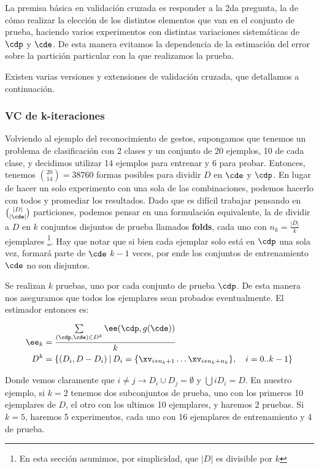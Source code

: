 La premisa básica en validación cruzada es responder a la 2da pregunta, la de cómo realizar la elección de los distintos elementos que van en el conjunto de prueba, haciendo varios experimentos con distintas variaciones sistemáticas de $\cdp$ y $\cde$. De esta manera evitamos la dependencia de la estimación del error sobre la partición particular con la que realizamos la prueba.

Existen varias versiones y extensiones de validación cruzada, que detallamos a continuación.

\subsubsection{VC de k-iteraciones}

Volviendo al ejemplo del reconocimiento de gestos, supongamos que tenemos un problema de clasificación con 2 clases y un conjunto de 20 ejemplos, 10 de cada clase, y decidimos utilizar 14 ejemplos para entrenar y 6 para probar. Entonces, tenemos $\binom{20}{14}=38760$ formas posibles para dividir $D$ en $\cde$ y $\cdp$. En lugar de hacer un solo experimento con una sola de las combinaciones, podemos hacerlo con todos y promediar los resultados. Dado que es difícil trabajar pensando en $\binom{|D|}{|\cde|}$ particiones, podemos pensar en una formulación equivalente, la de dividir a $D$ en $k$ conjuntos disjuntos de prueba llamados \textbf{folds}, cada uno con $n_k=\frac{|D|}{k}$ ejemplares \footnote{En esta sección asumimos, por simplicidad, que $|D|$ es divisible por $k$}. Hay que notar que si bien cada ejemplar solo está en $\cdp$ una sola vez, formará parte de $\cde$ $k-1$ veces, por ende los conjuntos de entrenamiento $\cde$ no son disjuntos. 

Se realizan $k$ pruebas, uno por cada conjunto de prueba $\cdp$. De esta manera nos aseguramos que todos los ejemplares sean probados eventualmente. El estimador entonces es:

\begin{align}
\ee_k &= \frac{ \sum\limits_{ (\cdp,\cde) \in D^k} {  \ee(\cdp,g(\cde) ) } }{k} \\ 
D^k &= \{ (D_i,D-D_i) \hspace{0.2em} | 
\hspace{0.2em} D_i= \{ \xv_{i*n_k+1} \dots \xv_{i*n_k+n_k} \}, \quad i=0..k-1  \}
\end{align}

Donde vemos claramente que $i\neq j \rightarrow D_i \cup D_j = \emptyset $ y $\bigcup{i} D_i = D$. En nuestro ejemplo, si $k=2$ tenemos dos subconjuntos de prueba, uno con los primeros 10 ejemplares de $D$, el otro con los ultimos 10 ejemplares, y haremos 2 pruebas. Si $k=5$, haremos 5 experimentos, cada uno con 16 ejemplares de entrenamiento y 4 de prueba. 

